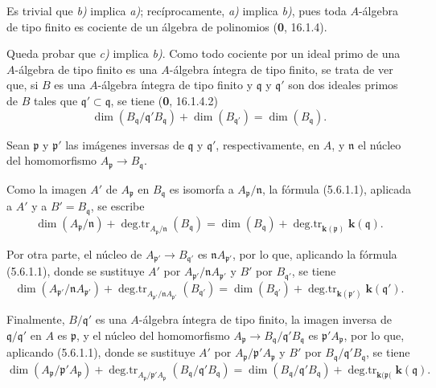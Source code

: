 Es trivial que \emph{b)} implica \emph{a)}; recíprocamente, \emph{a)} implica \emph{b)}, pues toda
$A$-álgebra de tipo finito es cociente de un álgebra de polinomios
(\textbf 0, 16.1.4).

Queda probar que \emph{c)} implica \emph{b)}. Como todo cociente por un ideal primo
de una $A$-álgebra de tipo finito es una $A$-álgebra íntegra de tipo finito, se trata
de ver que, si $B$ es una $A$-álgebra íntegra de tipo finito y $\mathfrak q$ y
$\mathfrak q'$ son dos ideales primos de $B$ tales que
$\mathfrak q'\subset\mathfrak q$, se tiene (\textbf 0, 16.1.4.2)
\begin{equation}
\dim(B_{\mathfrak q}/\mathfrak q'B_{\mathfrak q})
+\dim(B_{\mathfrak q'})=\dim(B_{\mathfrak q}).
\tag{5.6.1.2}\label{IV.2.s5.6.1.2-fr}
\end{equation}

Sean $\mathfrak p$ y $\mathfrak p'$ las imágenes inversas de $\mathfrak q$ y
$\mathfrak q'$, respectivamente, en $A$, y $\mathfrak n$ el núcleo del
homomorfismo $A_{\mathfrak p}\to B_{\mathfrak q}$.

Como la imagen $A'$ de $A_{\mathfrak p}$ en $B_{\mathfrak q}$ es isomorfa a
$A_{\mathfrak p}/\mathfrak n$, la fórmula (5.6.1.1), aplicada a $A'$ y a
$B'=B_{\mathfrak q}$, se escribe
\begin{equation}
\dim(A_{\mathfrak p}/\mathfrak n)
+\operatorname{deg.tr}_{A_{\mathfrak p}/\mathfrak n}(B_{\mathfrak q})
=\dim(B_{\mathfrak q})
+\operatorname{deg.tr}_{\mathbf{k}(\mathfrak p)}\boldsymbol{k}(\mathfrak q).
\tag{5.6.1.3}\label{IV.2.s5.6.1.3-fr}
\end{equation}

Por otra parte, el núcleo de $A_{\mathfrak p'}\to B_{\mathfrak q'}$ es
$\mathfrak nA_{\mathfrak p'}$, por lo que, aplicando la fórmula (5.6.1.1),
donde se sustituye $A'$ por
$A_{\mathfrak p'}/\mathfrak nA_{\mathfrak p'}$ y $B'$ por
$B_{\mathfrak q'}$, se tiene
\begin{equation}
\dim(A_{\mathfrak p'}/\mathfrak nA_{\mathfrak p'})
+\operatorname{deg.tr}_{A_{\mathfrak p'}/\mathfrak nA_{\mathfrak p'}}
(B_{\mathfrak q'})
=\dim(B_{\mathfrak q'})
+\operatorname{deg.tr}_{\mathbf{k}(\mathfrak p')}\boldsymbol{k}(\mathfrak q').
\tag{5.6.1.4}\label{IV.2.s5.6.1.4-fr}
\end{equation}

Finalmente, $B/\mathfrak q'$ es una $A$-álgebra íntegra de tipo finito, la
imagen inversa de $\mathfrak q/\mathfrak q'$ en $A$ es $\mathfrak p$, y el
núcleo del homomorfismo
$A_{\mathfrak p}\to B_{\mathfrak q}/\mathfrak q'B_{\mathfrak q}$ es
$\mathfrak p'A_{\mathfrak p}$, por lo que, aplicando (5.6.1.1), donde se
sustituye $A'$ por $A_{\mathfrak p}/\mathfrak p'A_{\mathfrak p}$ y $B'$ por
$B_{\mathfrak q}/\mathfrak q'B_{\mathfrak q}$, se tiene
\begin{equation}
\dim(A_{\mathfrak p}/\mathfrak p'A_{\mathfrak p})
+\operatorname{deg.tr}_{A_{\mathfrak p}/\mathfrak p'A_{\mathfrak p}}
(B_{\mathfrak q}/\mathfrak q'B_{\mathfrak q})
=\dim(B_{\mathfrak q}/\mathfrak q'B_{\mathfrak q})
+\operatorname{deg.tr}_{\mathbf{k}(\mathfrak p(}\boldsymbol{k}(\mathfrak q).
\tag{5.6.1.5}\label{IV.2.s5.6.1.5-fr}
\end{equation}

